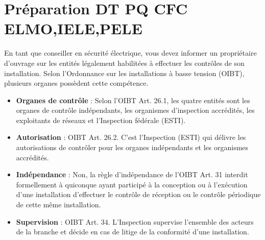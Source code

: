 \documentclass[a4paper,11pt,answers,addpoints]{exam}
\begin{document}
	\unframedsolutions
	\pointsinmargin
	\bracketedpoints
	
\section*{Préparation DT PQ CFC ELMO,IELE,PELE}
\begin{questions}
\question
En tant que conseiller en sécurité électrique, vous devez informer un propriétaire d'ouvrage sur les entités légalement habilitées à effectuer les contrôles de son installation. Selon l'Ordonnance sur les installations à basse tension (OIBT), plusieurs organes possèdent cette compétence.


\begin{solution}
	\begin{itemize}
		\item \textbf{Organes de contrôle} : Selon l'OIBT Art. 26.1, les quatre entités sont les organes de contrôle indépendants, les organismes d'inspection accrédités, les exploitants de réseaux et l'Inspection fédérale (ESTI).
		\item \textbf{Autorisation} :  OIBT Art. 26.2. C'est l'Inspection (ESTI) qui délivre les autorisations de contrôler pour les organes indépendants et les organismes accrédités.
		\item \textbf{Indépendance} : Non, la règle d'indépendance de l'OIBT Art. 31 interdit formellement à quiconque ayant participé à la conception ou à l'exécution d'une installation d'effectuer le contrôle de réception ou le contrôle périodique de cette même installation.
		\item \textbf{Supervision} : OIBT Art. 34.  L'Inspection supervise l'ensemble des acteurs de la branche et décide en cas de litige de la conformité d'une installation.
	\end{itemize}
\end{solution}
\end{questions}
\end{document}
